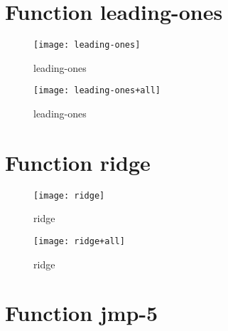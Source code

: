\newpage

\section{Function leading-ones}

\begin{center}

\end{center}

\begin{figure}[h]
\begin{center}
\texttt{[image: leading-ones]}
\caption{leading-ones}
\end{center}
\end{figure}

\begin{figure}[h]
\begin{center}
\texttt{[image: leading-ones+all]}
\caption{leading-ones}
\end{center}
\end{figure}

\newpage

\section{Function ridge}

\begin{center}

\end{center}

\begin{figure}[h]
\begin{center}
\texttt{[image: ridge]}
\caption{ridge}
\end{center}
\end{figure}

\begin{figure}[h]
\begin{center}
\texttt{[image: ridge+all]}
\caption{ridge}
\end{center}
\end{figure}

\newpage

\section{Function jmp-5}

\begin{center}

\end{center}

